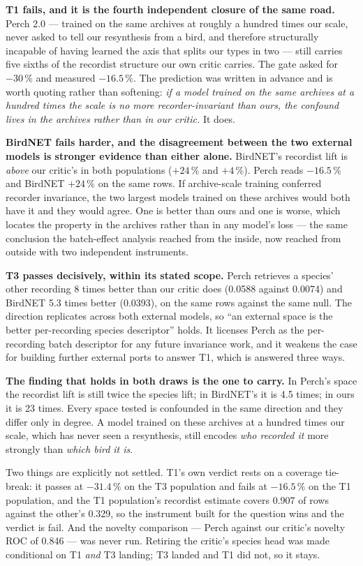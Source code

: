 \documentclass[10pt,twocolumn,a4paper]{article}
\begin{document}
\textbf{T1 fails, and it is the fourth independent closure of the same road.} Perch 2.0 ---
trained on the same archives at roughly a hundred times our scale, never asked to tell our
resynthesis from a bird, and therefore structurally incapable of having learned the axis that
splits our types in two --- still carries five sixths of the recordist structure our own
critic carries. The gate asked for $-30\,\%$ and measured $-16.5\,\%$. The prediction was
written in advance and is worth quoting rather than softening: \emph{if a model trained on
the same archives at a hundred times the scale is no more recorder-invariant than ours, the
confound lives in the archives rather than in our critic.} It does.

\textbf{BirdNET fails harder, and the disagreement between the two external models is
stronger evidence than either alone.} BirdNET's recordist lift is \emph{above} our critic's
in both populations ($+24\,\%$ and $+4\,\%$). Perch reads $-16.5\,\%$ and BirdNET $+24\,\%$
on the same rows. If archive-scale training conferred recorder invariance, the two largest
models trained on these archives would both have it and they would agree. One is better than
ours and one is worse, which locates the property in the archives rather than in any model's
loss --- the same conclusion the batch-effect analysis reached from the inside, now reached
from outside with two independent instruments.

\textbf{T3 passes decisively, within its stated scope.} Perch retrieves a species' other
recording 8 times better than our critic does (0.0588 against 0.0074) and BirdNET 5.3 times
better (0.0393), on the same rows against the same null. The direction replicates across both
external models, so ``an external space is the better per-recording species descriptor''
holds. It licenses Perch as the per-recording batch descriptor for any future invariance
work, and it weakens the case for building further external ports to answer T1, which is
answered three ways.

\textbf{The finding that holds in both draws is the one to carry.} In Perch's space the
recordist lift is still twice the species lift; in BirdNET's it is 4.5 times; in ours it is
23 times. Every space tested is confounded in the same direction and they differ only in
degree. A model trained on these archives at a hundred times our scale, which has never seen
a resynthesis, still encodes \emph{who recorded it} more strongly than \emph{which bird it
is}.

Two things are explicitly not settled. T1's own verdict rests on a coverage tie-break: it
passes at $-31.4\,\%$ on the T3 population and fails at $-16.5\,\%$ on the T1 population,
and the T1 population's recordist estimate covers 0.907 of rows against the other's 0.329, so
the instrument built for the question wins and the verdict is fail. And the novelty
comparison --- Perch against our critic's novelty ROC of 0.846 --- was never run. Retiring
the critic's species head was made conditional on T1 \emph{and} T3 landing; T3 landed and T1
did not, so it stays.
\end{document}
